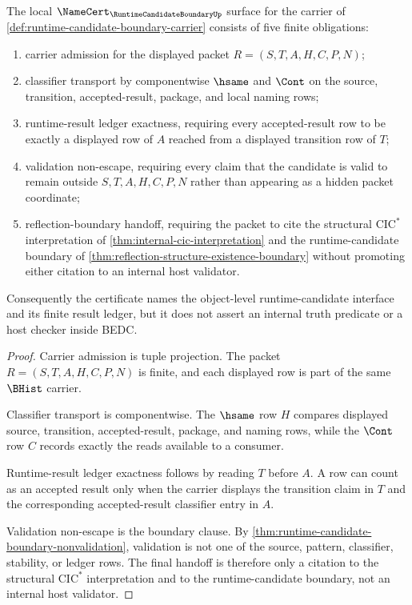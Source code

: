 \begin{theorem}
\label{thm:runtime-candidate-boundary-namecert-obligations}
The local $\NameCert_{\RuntimeCandidateBoundaryUp}$ surface for the carrier of \autoref{def:runtime-candidate-boundary-carrier} consists of five finite obligations:
\begin{enumerate}
\item carrier admission for the displayed packet $R=(S,T,A,H,C,P,N)$;
\item classifier transport by componentwise $\hsame$ and $\Cont$ on the source, transition, accepted-result, package, and local naming rows;
\item runtime-result ledger exactness, requiring every accepted-result row to be exactly a displayed row of $A$ reached from a displayed transition row of $T$;
\item validation non-escape, requiring every claim that the candidate is valid to remain outside $S,T,A,H,C,P,N$ rather than appearing as a hidden packet coordinate;
\item reflection-boundary handoff, requiring the packet to cite the structural $\mathrm{CIC}^{*}$ interpretation of \autoref{thm:internal-cic-interpretation} and the runtime-candidate boundary of \autoref{thm:reflection-structure-existence-boundary} without promoting either citation to an internal host validator.
\end{enumerate}
Consequently the certificate names the object-level runtime-candidate interface and its finite result ledger, but it does not assert an internal truth predicate or a host checker inside BEDC.
\end{theorem}
\begin{proof}
Carrier admission is tuple projection. The packet $R=(S,T,A,H,C,P,N)$ is finite, and each displayed row is part of the same $\BHist$ carrier.

Classifier transport is componentwise. The $\hsame$ row $H$ compares displayed source, transition, accepted-result, package, and naming rows, while the $\Cont$ row $C$ records exactly the reads available to a consumer.

Runtime-result ledger exactness follows by reading $T$ before $A$. A row can count as an accepted result only when the carrier displays the transition claim in $T$ and the corresponding accepted-result classifier entry in $A$.

Validation non-escape is the boundary clause. By \autoref{thm:runtime-candidate-boundary-nonvalidation}, validation is not one of the source, pattern, classifier, stability, or ledger rows. The final handoff is therefore only a citation to the structural $\mathrm{CIC}^{*}$ interpretation and to the runtime-candidate boundary, not an internal host validator.
\end{proof}

